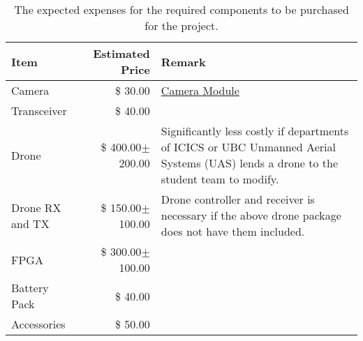 \begin{table}[H]
    \centering
    \caption{The expected expenses for the required components to be purchased for the project.}
    \label{table:budget-items}

    \begin{tabular}{lrp{9cm}}

    \hline
    \textbf{Item} & \textbf{Estimated Price} & \textbf{Remark}\\
    \hline
    Camera&\$ \hfill30.00&\href{https://www.amazon.ca/Raspberry-Pi-Camera-Module-Megapixel/dp/B01ER2SKFS/ref=sr_1_3?crid=OOVX563QBZOF&keywords=raspberry+pi+camera&qid=1570511628&sprefix=raspbe\%2Caps\%2C238&sr=8-3}{Camera Module}\\
    Transceiver&\$ \hfill40.00&\\
    Drone&\$ \hfill400.00$\pm$200.00& Significantly less costly if departments of ICICS or UBC Unmanned Aerial Systems (UAS) lends a drone to the student team to modify.\\
    Drone RX and TX & \$ \hfill 150.00$\pm$100.00 & Drone controller and receiver is necessary if the above drone package does not have them included.\\
    FPGA&\$ \hfill 300.00$\pm$100.00&\\
    Battery Pack&\$ \hfill40.00&\\
    Accessories&\$ \hfill50.00&\\
    \hline

    \end{tabular} 
\end{table}
